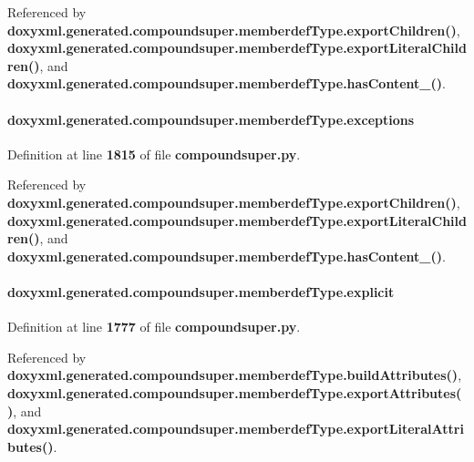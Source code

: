 Referenced by {\bf doxyxml.\+generated.\+compoundsuper.\+memberdef\+Type.\+export\+Children()}, {\bf doxyxml.\+generated.\+compoundsuper.\+memberdef\+Type.\+export\+Literal\+Children()}, and {\bf doxyxml.\+generated.\+compoundsuper.\+memberdef\+Type.\+has\+Content\+\_\+()}.

\paragraph[{exceptions}]{\setlength{\rightskip}{0pt plus 5cm}doxyxml.\+generated.\+compoundsuper.\+memberdef\+Type.\+exceptions}\label{classdoxyxml_1_1generated_1_1compoundsuper_1_1memberdefType_a8e11618ddf9323fa571fdd469b7b8b82}


Definition at line {\bf 1815} of file {\bf compoundsuper.\+py}.



Referenced by {\bf doxyxml.\+generated.\+compoundsuper.\+memberdef\+Type.\+export\+Children()}, {\bf doxyxml.\+generated.\+compoundsuper.\+memberdef\+Type.\+export\+Literal\+Children()}, and {\bf doxyxml.\+generated.\+compoundsuper.\+memberdef\+Type.\+has\+Content\+\_\+()}.

\paragraph[{explicit}]{\setlength{\rightskip}{0pt plus 5cm}doxyxml.\+generated.\+compoundsuper.\+memberdef\+Type.\+explicit}\label{classdoxyxml_1_1generated_1_1compoundsuper_1_1memberdefType_a3caf153c9288cbd8b5f8031d0de48a78}


Definition at line {\bf 1777} of file {\bf compoundsuper.\+py}.



Referenced by {\bf doxyxml.\+generated.\+compoundsuper.\+memberdef\+Type.\+build\+Attributes()}, {\bf doxyxml.\+generated.\+compoundsuper.\+memberdef\+Type.\+export\+Attributes()}, and {\bf doxyxml.\+generated.\+compoundsuper.\+memberdef\+Type.\+export\+Literal\+Attributes()}.

